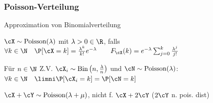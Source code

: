 \subsubsection{Poisson-Verteilung}
{\scriptsize Approximation von Binomialverteilung}

\shortdefinition $\cX \sim \text{Poisson}(\lambda)$ mit $\lambda > 0 \in \R$, falls\\
$\forall k \in \N \quad \P[\cX = k] = \frac{\lambda^k}{k!} e^{-\lambda}  \qquad F_\cX(k) = e^{-\lambda} \sum_{j = 0}^{k} \frac{\lambda^j}{j!}$

\shorttheorem Für $n \in \N$ Z.V. $\cX_i \sim \text{Bin}\left( n, \frac{\lambda}{n} \right)$ und $\cN \sim \text{Poisson}(\lambda)$:
$\forall k \in \N \quad \limni \P[\cX_i = k] = \P[\cN = k]$

$\cX + \cY \sim \text{Poisson}(\lambda + \mu)$, nicht f. $\cX + 2\cY$ ($2\cY$ n. pois. dist)
